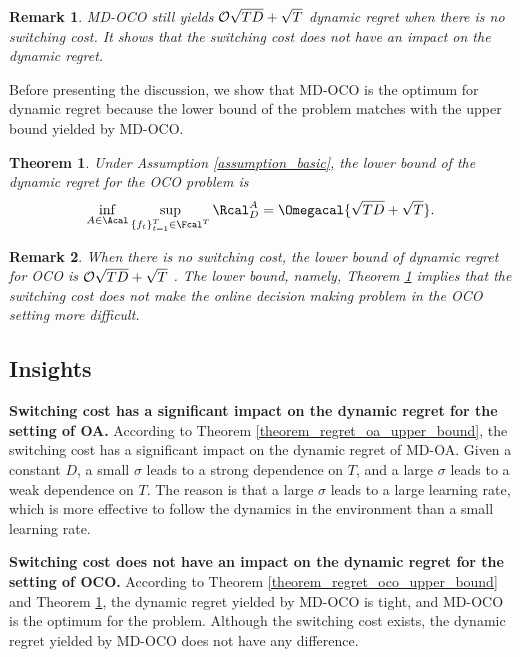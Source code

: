 \documentclass[journal]{IEEEtran}
\newtheorem{Theorem}{\bf{Theorem}}
\newtheorem{Remark}{\bf{Remark}}
\begin{document}
\begin{Remark}
MD-OCO still yields ${\mathcal{O}}{\sqrt{TD}  + \sqrt{T}}$ dynamic regret \cite{Gyorgy:2016} when there is no switching cost. It shows that the switching cost does not have an impact on the dynamic regret.
\end{Remark}

Before presenting the discussion, we show that MD-OCO is the optimum for dynamic regret because the lower bound of the problem matches with the upper bound yielded by MD-OCO. 

\begin{Theorem}
\label{theorem_lower_bound_oco}
Under Assumption \ref{assumption_basic}, the lower bound of the dynamic regret for the OCO problem is  
\begin{align}
\nonumber
\inf_{A\in\Acal} \sup_{\{f_{t}\}_{t=1}^T \in \Fcal^T} \Rcal_D^A  = \Omegacal{\sqrt{TD} + \sqrt{T}}.
\end{align}
\end{Theorem}



\begin{Remark}
When there is no switching cost, the lower bound of dynamic regret for OCO is ${\mathcal{O}}{\sqrt{TD}+\sqrt{T}}$ \cite{Zhao:2018wx}. The lower bound, namely, Theorem \ref{theorem_lower_bound_oco} implies that the switching cost does not make the online decision making problem in the OCO setting more difficult. 
\end{Remark}

\subsection{Insights}

\textbf{Switching cost has a significant impact on the dynamic regret for the setting of OA.} According to Theorem \ref{theorem_regret_oa_upper_bound}, the switching cost has a significant impact on the dynamic regret of MD-OA. Given a constant $D$, a small $\sigma$ leads to a strong dependence on $T$, and  a large $\sigma$ leads to a weak dependence on $T$. The reason is that  a large $\sigma$ leads to a large learning rate, which is more effective to follow the dynamics in the environment than a small learning rate. 

\textbf{Switching cost does not have an impact on the dynamic regret for the setting of OCO.} According to Theorem 
\ref{theorem_regret_oco_upper_bound} and Theorem \ref{theorem_lower_bound_oco},  the dynamic regret yielded by MD-OCO is tight, and MD-OCO is the optimum for the problem. Although the switching cost exists, the dynamic regret yielded by MD-OCO does not have any difference. 
\end{document}
